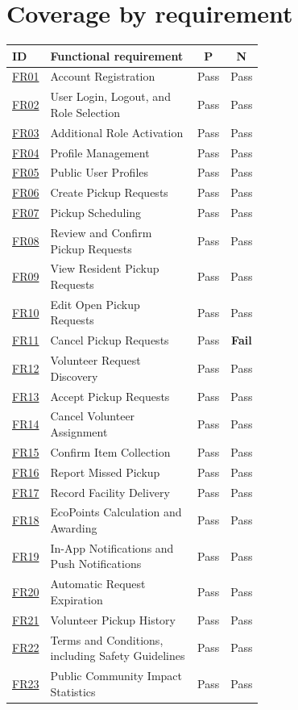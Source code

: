 \documentclass[11pt]{article}
\begin{document}
\section{Coverage by requirement}
\begin{longtable}{lp{0.62\linewidth}cc}
\toprule
ID & Functional requirement & P & N \\
\midrule
\endhead
\bottomrule
\endfoot
\hyperref[FR01]{FR01} & Account Registration & Pass & Pass \\
\hyperref[FR02]{FR02} & User Login, Logout, and Role Selection & Pass & Pass \\
\hyperref[FR03]{FR03} & Additional Role Activation & Pass & Pass \\
\hyperref[FR04]{FR04} & Profile Management & Pass & Pass \\
\hyperref[FR05]{FR05} & Public User Profiles & Pass & Pass \\
\hyperref[FR06]{FR06} & Create Pickup Requests & Pass & Pass \\
\hyperref[FR07]{FR07} & Pickup Scheduling & Pass & Pass \\
\hyperref[FR08]{FR08} & Review and Confirm Pickup Requests & Pass & Pass \\
\hyperref[FR09]{FR09} & View Resident Pickup Requests & Pass & Pass \\
\hyperref[FR10]{FR10} & Edit Open Pickup Requests & Pass & Pass \\
\hyperref[FR11]{FR11} & Cancel Pickup Requests & Pass & \textbf{\color{failred}Fail} \\
\hyperref[FR12]{FR12} & Volunteer Request Discovery & Pass & Pass \\
\hyperref[FR13]{FR13} & Accept Pickup Requests & Pass & Pass \\
\hyperref[FR14]{FR14} & Cancel Volunteer Assignment & Pass & Pass \\
\hyperref[FR15]{FR15} & Confirm Item Collection & Pass & Pass \\
\hyperref[FR16]{FR16} & Report Missed Pickup & Pass & Pass \\
\hyperref[FR17]{FR17} & Record Facility Delivery & Pass & Pass \\
\hyperref[FR18]{FR18} & EcoPoints Calculation and Awarding & Pass & Pass \\
\hyperref[FR19]{FR19} & In-App Notifications and Push Notifications & Pass & Pass \\
\hyperref[FR20]{FR20} & Automatic Request Expiration & Pass & Pass \\
\hyperref[FR21]{FR21} & Volunteer Pickup History & Pass & Pass \\
\hyperref[FR22]{FR22} & Terms and Conditions, including Safety Guidelines & Pass & Pass \\
\hyperref[FR23]{FR23} & Public Community Impact Statistics & Pass & Pass \\
\end{longtable}
\end{document}
